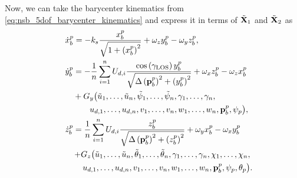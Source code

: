Now, we can take the barycenter kinematics from \eqref{eq:nsb_5dof_barycenter_kinematics} and express it in terms of $\tilde{\mathbf{X}}_1$ and $\tilde{\mathbf{X}}_2$ as
\begin{subequations}
    \begin{align}
        &\dot{x}_b^p = -k_{s}\frac{x_b^p}{\sqrt{1+\left(x_b^p\right)^2}} + \omega_zy_b^p - \omega_yz_b^p, \label{eq:nsb_5dof_x_pb_CL} \\
        &\begin{aligned}
            \dot{y}_b^p &= - \frac{1}{n}\sum_{i=1}^n U_{d,i}{\frac{\cos\left(\gamma_{\rm LOS}\right)y_b^p}{\sqrt{\Delta\left(\mat{p}_b^p\right)^2 + \left(y_b^p\right)^2}}} + \omega_xz_b^p - \mathrlap{\omega_zx_b^p} \\
            & + G_y\big(\tilde{u}_1, \ldots, \tilde{u}_n, \tilde{\psi}_1, \ldots, \tilde{\psi}_n, \gamma_1, \ldots, \gamma_n, \\
            & \quad\quad \mathrlap{u_{d,1}, \ldots, u_{d,n}, v_1, \ldots, v_n, w_1, \ldots, w_n, \mat{p}_b^p, \psi_p\big),}
        \end{aligned} \\
        &\begin{aligned}[t]
            \dot{z}_b^p &= \frac{1}{n} \sum_{i=1}^n U_{d,i}\frac{z_b^p}{\sqrt{\Delta\left(\mat{p}_b^p\right)^2 + \left(z_b^p\right)^2}} + \omega_yx_b^p - \omega_xy_b^p \\
            & \,\mathrlap{+ G_z\big(\tilde{u}_1, \ldots, \tilde{u}_n, \tilde{\theta}_1, \ldots, \tilde{\theta}_n, \gamma_1, \ldots, \gamma_n, \chi_1, \ldots, \chi_n,} \\
            & \mathrlap{\quad\, u_{d,1}, \ldots, u_{d,n}, v_1, \ldots, v_n, w_1, \ldots, w_n, \mat{p}_b^p, \psi_p, \theta_p\big).}
        \end{aligned} \label{eq:nsb_5dof_z_pb_CL}
    \end{align} \label{eq:nsb_5dof_nominal}
\end{subequations}

